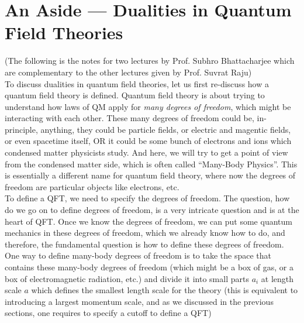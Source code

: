 \documentclass[11pt]{article}
\numberwithin{equation}{section}
\begin{document}
\newpage
\section{An Aside — Dualities in Quantum Field Theories}
(The following is the notes for two lectures by Prof. Subhro Bhattacharjee which are complementary to the other lectures given by Prof. Suvrat Raju)\\

To discuss dualities in quantum field theories, let us first re-discuss how a quantum field theory is defined. Quantum field theory is about trying to understand how laws of QM apply for \textit{many degrees of freedom}, which might be interacting with each other. These many degrees of freedom could be, in-principle, anything, they could be particle fields, or electric and magentic fields, or even spacetime itself, OR it could be some bunch of electrons and ions which condensed matter physicists study. And here, we will try to get a point of view from the condensed matter side, which is often called ``Many-Body Physics''. This is essentially a different name for quantum field theory, where now the degrees of freedom are particular objects like electrons, etc.\\

To define a QFT, we need to specify the degrees of freedom. The question, how do we go on to define degrees of freedom, is a very intricate question and is at the heart of QFT. Once we know the degrees of freedom, we can put some quantum mechanics in these degrees of freedom, which we already know how to do, and therefore, the fundamental question is how to define these degrees of freedom. One way to define many-body degrees of freedom is to take the space that contains these many-body degrees of freedom (which might be a box of gas, or a box of electromagnetic radiation, etc.) and divide it into small parts \(a_i\) at length scale \(a\) which defines the smallest length scale for the theory (this is equivalent to introducing a largest momentum scale, and as we discussed in the previous sections, one requires to specify a cutoff to define a QFT)
\end{document}
